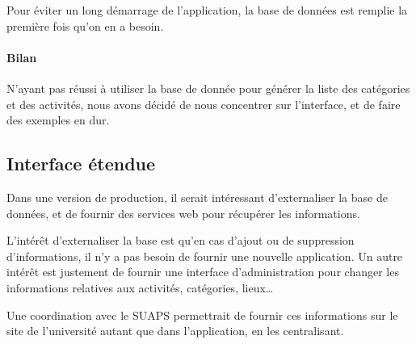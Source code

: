 \documentclass{article}
\begin{document}
        Pour éviter un long démarrage de l'application, la base de données est
        remplie la première fois qu'on en a besoin.

        \paragraph{Bilan} N'ayant pas réussi à utiliser la base de donnée pour
        générer la liste des catégories et des activités, nous avons décidé de
        nous concentrer sur l'interface, et de faire des exemples en dur.


    \subsection{Interface étendue}

        Dans une version de production, il serait intéressant d'externaliser la
        base de données, et de fournir des services web pour récupérer les
        informations.

        L'intérêt d'externaliser la base est qu'en cas d'ajout ou de suppression
        d'informations, il n'y a pas besoin de fournir une nouvelle application.
        Un autre intérêt est justement de fournir une interface d'administration
        pour changer les informations relatives aux activités, catégories,
        lieux\dots

        Une coordination avec le SUAPS permettrait de fournir ces informations
        sur le site de l'université autant que dans l'application, en les centralisant.
\end{document}
